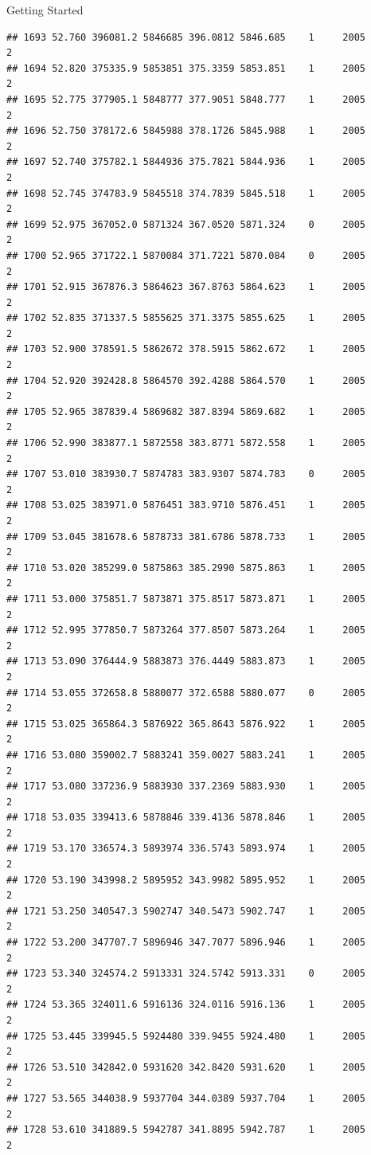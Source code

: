 \documentclass[
  ignorenonframetext,
]{beamer}
\begin{document}
\begin{frame}[fragile]{Getting Started}
\begin{verbatim}
## 1693 52.760 396081.2 5846685 396.0812 5846.685    1     2005        2
## 1694 52.820 375335.9 5853851 375.3359 5853.851    1     2005        2
## 1695 52.775 377905.1 5848777 377.9051 5848.777    1     2005        2
## 1696 52.750 378172.6 5845988 378.1726 5845.988    1     2005        2
## 1697 52.740 375782.1 5844936 375.7821 5844.936    1     2005        2
## 1698 52.745 374783.9 5845518 374.7839 5845.518    1     2005        2
## 1699 52.975 367052.0 5871324 367.0520 5871.324    0     2005        2
## 1700 52.965 371722.1 5870084 371.7221 5870.084    0     2005        2
## 1701 52.915 367876.3 5864623 367.8763 5864.623    1     2005        2
## 1702 52.835 371337.5 5855625 371.3375 5855.625    1     2005        2
## 1703 52.900 378591.5 5862672 378.5915 5862.672    1     2005        2
## 1704 52.920 392428.8 5864570 392.4288 5864.570    1     2005        2
## 1705 52.965 387839.4 5869682 387.8394 5869.682    1     2005        2
## 1706 52.990 383877.1 5872558 383.8771 5872.558    1     2005        2
## 1707 53.010 383930.7 5874783 383.9307 5874.783    0     2005        2
## 1708 53.025 383971.0 5876451 383.9710 5876.451    1     2005        2
## 1709 53.045 381678.6 5878733 381.6786 5878.733    1     2005        2
## 1710 53.020 385299.0 5875863 385.2990 5875.863    1     2005        2
## 1711 53.000 375851.7 5873871 375.8517 5873.871    1     2005        2
## 1712 52.995 377850.7 5873264 377.8507 5873.264    1     2005        2
## 1713 53.090 376444.9 5883873 376.4449 5883.873    1     2005        2
## 1714 53.055 372658.8 5880077 372.6588 5880.077    0     2005        2
## 1715 53.025 365864.3 5876922 365.8643 5876.922    1     2005        2
## 1716 53.080 359002.7 5883241 359.0027 5883.241    1     2005        2
## 1717 53.080 337236.9 5883930 337.2369 5883.930    1     2005        2
## 1718 53.035 339413.6 5878846 339.4136 5878.846    1     2005        2
## 1719 53.170 336574.3 5893974 336.5743 5893.974    1     2005        2
## 1720 53.190 343998.2 5895952 343.9982 5895.952    1     2005        2
## 1721 53.250 340547.3 5902747 340.5473 5902.747    1     2005        2
## 1722 53.200 347707.7 5896946 347.7077 5896.946    1     2005        2
## 1723 53.340 324574.2 5913331 324.5742 5913.331    0     2005        2
## 1724 53.365 324011.6 5916136 324.0116 5916.136    1     2005        2
## 1725 53.445 339945.5 5924480 339.9455 5924.480    1     2005        2
## 1726 53.510 342842.0 5931620 342.8420 5931.620    1     2005        2
## 1727 53.565 344038.9 5937704 344.0389 5937.704    1     2005        2
## 1728 53.610 341889.5 5942787 341.8895 5942.787    1     2005        2

\end{verbatim}
\end{frame}
\end{document}
